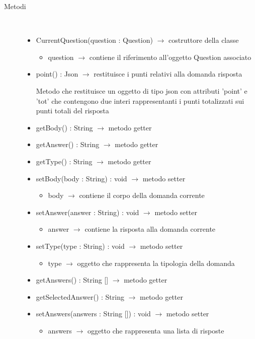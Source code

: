\begin{description}
\item[Metodi] \hfill \\
\vspace{-7mm}
\begin{itemize}
	\item CurrentQuestion(question : Question) $\rightarrow$ costruttore della classe\begin{itemize}
		\item question $\rightarrow$ contiene il riferimento all'oggetto Question associato
	\end{itemize}
	
	\item point() : Json $\rightarrow$ restituisce i punti relativi alla domanda risposta
	
	Metodo che restituisce un oggetto di tipo json con attributi 'point' e 'tot' che contengono due interi rappresentanti i punti totalizzati sui punti totali del risposta
	\item getBody() : String $\rightarrow$ metodo getter
	\item getAnswer() : String $\rightarrow$ metodo getter
	\item getType() : String $\rightarrow$ metodo getter
	\item setBody(body : String) : void $\rightarrow$ metodo setter\begin{itemize}
		\item body $\rightarrow$ contiene il corpo della domanda corrente 
	\end{itemize}
	
	\item setAnswer(answer : String) : void $\rightarrow$ metodo setter\begin{itemize}
		\item answer $\rightarrow$ contiene la risposta alla domanda corrente
	\end{itemize}
	
	\item setType(type : String) : void $\rightarrow$ metodo setter\begin{itemize}
		\item type $\rightarrow$ oggetto che rappresenta la tipologia della domanda
	\end{itemize}
	
	\item getAnswers() : String [] $\rightarrow$ metodo getter
	\item getSelectedAnswer() : String $\rightarrow$ metodo getter
	\item setAnswers(answers : String []) : void $\rightarrow$ metodo setter\begin{itemize}
		\item answers $\rightarrow$ oggetto che rappresenta una lista di risposte
	\end{itemize}
	

\end{itemize}
\end{description}
